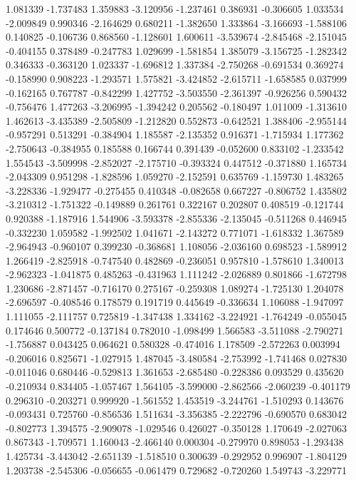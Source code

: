 1.081339
-1.737483
1.359883
-3.120956
-1.237461
0.386931
-0.306605
1.033534
-2.009849
0.990346
-2.164629
0.680211
-1.382650
1.333864
-3.166693
-1.588106
0.140825
-0.106736
0.868560
-1.128601
1.600611
-3.539674
-2.845468
-2.151045
-0.404155
0.378489
-0.247783
1.029699
-1.581854
1.385079
-3.156725
-1.282342
0.346333
-0.363120
1.023337
-1.696812
1.337384
-2.750268
-0.691534
0.369274
-0.158990
0.908223
-1.293571
1.575821
-3.424852
-2.615711
-1.658585
0.037999
-0.162165
0.767787
-0.842299
1.427752
-3.503550
-2.361397
-0.926256
0.590432
-0.756476
1.477263
-3.206995
-1.394242
0.205562
-0.180497
1.011009
-1.313610
1.462613
-3.435389
-2.505809
-1.212820
0.552873
-0.642521
1.388406
-2.955144
-0.957291
0.513291
-0.384904
1.185587
-2.135352
0.916371
-1.715934
1.177362
-2.750643
-0.384955
0.185588
0.166744
0.391439
-0.052600
0.833102
-1.233542
1.554543
-3.509998
-2.852027
-2.175710
-0.393324
0.447512
-0.371880
1.165734
-2.043309
0.951298
-1.828596
1.059270
-2.152591
0.635769
-1.159730
1.483265
-3.228336
-1.929477
-0.275455
0.410348
-0.082658
0.667227
-0.806752
1.435802
-3.210312
-1.751322
-0.149889
0.261761
0.322167
0.202807
0.408519
-0.121744
0.920388
-1.187916
1.544906
-3.593378
-2.855336
-2.135045
-0.511268
0.446945
-0.332230
1.059582
-1.992502
1.041671
-2.143272
0.771071
-1.618332
1.367589
-2.964943
-0.960107
0.399230
-0.368681
1.108056
-2.036160
0.698523
-1.589912
1.266419
-2.825918
-0.747540
0.482869
-0.236051
0.957810
-1.578610
1.340013
-2.962323
-1.041875
0.485263
-0.431963
1.111242
-2.026889
0.801866
-1.672798
1.230686
-2.871457
-0.716170
0.275167
-0.259308
1.089274
-1.725130
1.204078
-2.696597
-0.408546
0.178579
0.191719
0.445649
-0.336634
1.106088
-1.947097
1.111055
-2.111757
0.725819
-1.347438
1.334162
-3.224921
-1.764249
-0.055045
0.174646
0.500772
-0.137184
0.782010
-1.098499
1.566583
-3.511088
-2.790271
-1.756887
0.043425
0.064621
0.580328
-0.474016
1.178509
-2.572263
0.003994
-0.206016
0.825671
-1.027915
1.487045
-3.480584
-2.753992
-1.741468
0.027830
-0.011046
0.680446
-0.529813
1.361653
-2.685480
-0.228386
0.093529
0.435620
-0.210934
0.834405
-1.057467
1.564105
-3.599000
-2.862566
-2.060239
-0.401179
0.296310
-0.203271
0.999920
-1.561552
1.453519
-3.244761
-1.510293
0.143676
-0.093431
0.725760
-0.856536
1.511634
-3.356385
-2.222796
-0.690570
0.683042
-0.802773
1.394575
-2.909078
-1.029546
0.426027
-0.350128
1.170649
-2.027063
0.867343
-1.709571
1.160043
-2.466140
0.000304
-0.279970
0.898053
-1.293438
1.425734
-3.443042
-2.651139
-1.518510
0.300639
-0.292952
0.996907
-1.804129
1.203738
-2.545306
-0.056655
-0.061479
0.729682
-0.720260
1.549743
-3.229771
